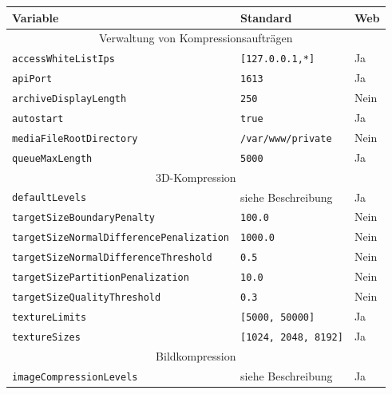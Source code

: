 \begin{table}
\begin{center}
\begin{tabular}{lll}
\hline
Variable & Standard & Web\\
\hline
\multicolumn{3}{c}{Verwaltung von Kompressionsaufträgen} \\
\hline
{\lstinline|accessWhiteListIps|} & {\lstinline|[127.0.0.1,*]|} & {\footnotesize Ja} \\
{\lstinline|apiPort|} & {\lstinline|1613|} & {\footnotesize Ja} \\
{\lstinline|archiveDisplayLength|} & {\lstinline|250|} & {\footnotesize Nein} \\
{\lstinline|autostart|} & {\lstinline|true|} & {\footnotesize Ja} \\
{\lstinline|mediaFileRootDirectory|} & {\lstinline|/var/www/private|} & {\footnotesize Nein} \\
{\lstinline|queueMaxLength|} & {\lstinline|5000|} & {\footnotesize Ja} \\
\hline
\multicolumn{3}{c}{3D-Kompression} \\
\hline
{\lstinline|defaultLevels|} & {\footnotesize siehe Beschreibung} & {\footnotesize Ja} \\
{\lstinline|targetSizeBoundaryPenalty|} & {\lstinline|100.0|} & {\footnotesize Nein} \\
{\lstinline|targetSizeNormalDifferencePenalization|} & {\lstinline|1000.0|} & {\footnotesize Nein} \\
{\lstinline|targetSizeNormalDifferenceThreshold|} & {\lstinline|0.5|} & {\footnotesize Nein} \\
{\lstinline|targetSizePartitionPenalization|} & {\lstinline|10.0|} & {\footnotesize Nein} \\
{\lstinline|targetSizeQualityThreshold|} & {\lstinline|0.3|} & {\footnotesize Nein} \\
{\lstinline|textureLimits|} & {\lstinline|[5000, 50000]|} & {\footnotesize Ja} \\
{\lstinline|textureSizes|} & {\lstinline|[1024, 2048, 8192]|} & {\footnotesize Ja} \\
\hline
\multicolumn{3}{c}{Bildkompression} \\
\hline
{\lstinline|imageCompressionLevels|} & {\footnotesize siehe Beschreibung} & {\footnotesize Ja} \\


\end{tabular}
\end{center}
\end{table}
